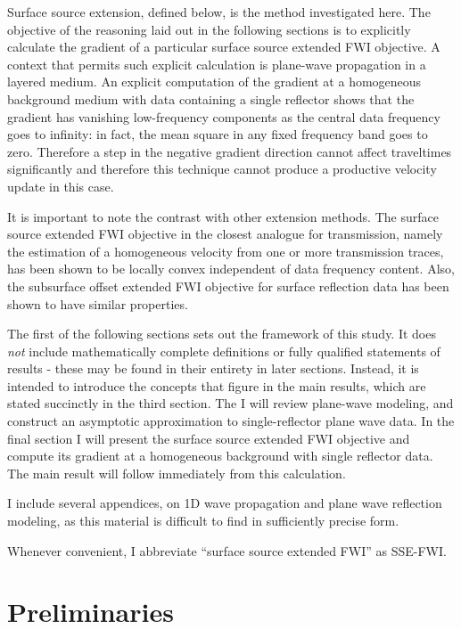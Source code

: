 Surface source extension, defined below, is the method investigated
here. The objective of the reasoning laid out in the following sections is
to explicitly calculate the gradient of a particular surface source
extended FWI objective. A context that permits such explicit
calculation is plane-wave propagation in a layered medium. An explicit
computation of the gradient at a homogeneous background medium with
data containing a single reflector shows that the gradient has
vanishing low-frequency components as the central data frequency goes
to infinity: in fact, the mean square in any fixed frequency band goes
to zero. Therefore a step in the negative gradient direction cannot
affect traveltimes significantly and therefore this technique cannot
produce a productive velocity update in this case.

It is important to note the contrast with other extension methods. The
surface source extended FWI objective in the closest analogue for
transmission, namely the estimation of a homogeneous velocity from one
or more transmission traces, has been shown to be locally convex
independent of data frequency content. Also, the subsurface offset
extended FWI objective for surface reflection data has been shown to
have similar properties.

The first of the following sections sets out the framework of this
study. It does {\em not} include mathematically complete definitions
or fully qualified statements of results - these may be found in their
entirety in later sections. Instead, it is intended to introduce the
concepts that figure in the main results, which are stated succinctly
in the third section. The  I will review plane-wave modeling, and construct
an asymptotic approximation to single-reflector plane wave data. In
the final section I will present the surface source extended FWI
objective and compute its gradient at a homogeneous background with
single reflector data. The main result will follow immediately from
this calculation.

I include several appendices, on 1D wave propagation and plane wave
reflection modeling, as this material is difficult to find in
sufficiently precise form.

Whenever convenient, I abbreviate ``surface source extended FWI'' as SSE-FWI.

\section{Preliminaries}



